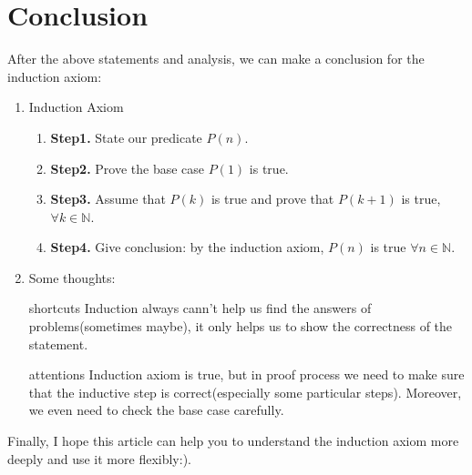 \documentclass{Math_Note}
\begin{document}
\section{Conclusion}

After the above statements and analysis, we can make a conclusion for the induction axiom:

\begin{enumerate}
    \item Induction Axiom
    \begin{enumerate}
        \item \textbf{Step1.} State our predicate $P(n)$.
        \item \textbf{Step2.} Prove the base case $P(1)$ is true.
        \item \textbf{Step3.} Assume that $P(k)$ is true and prove that $P(k+1)$ is true, $\forall k \in \mathbb{N}$.
        \item \textbf{Step4.} Give conclusion: by the induction axiom, $P(n)$ is true $\forall n \in \mathbb{N}$.
    \end{enumerate}
    \item Some thoughts:
    \item [shortcuts]Induction always cann't help us find the answers of problems(sometimes maybe), it only helps us to show the correctness of the statement.
    \item [attentions]Induction axiom is true, but in proof process we need to make sure that the inductive step is correct(especially some particular steps). Moreover, we even need to check the base case carefully.
\end{enumerate}

Finally, I hope this article can help you to understand the induction axiom more deeply and use it more flexibly:).
\end{document}
